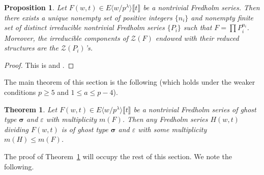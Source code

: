 \documentclass[12pt]{amsart}
\newtheorem{theorem}[subsection]{Theorem}
\newtheorem{proposition}[subsection]{Proposition}
\theoremstyle{definition}
\numberwithin{equation}{subsection}
\def\calZ{\mathcal{Z}}
\newcommand{\bbsigma}{\boldsymbol{\sigma}}
\begin{document}
\begin{proposition}
Let $F(w,t)\in E\langle w/p^\lambda\rangle\llbracket t\rrbracket$ be a nontrivial Fredholm series. Then there exists a unique nonempty set of positive integers $\{n_i\}$ and nonempty  finite set of distinct irreducible nontrivial Fredholm series $\{P_i\}$ such that $F = \prod P_i^{n_i}$. Moreover, the irreducible components of $\calZ(F)$ endowed with their reduced structures are the $\calZ(P_i)$'s.
\end{proposition}
\begin{proof}
This is \cite[Theorem~1.3.7]{coleman-mazur} and \cite[Corollary~4.2.3]{conrad}.
\end{proof}

The main theorem of this section is the following (which holds under the weaker conditions $p \geq 5$ and $1 \leq a\leq p-4$).
\begin{theorem}
\label{T:irreducible factors}
Let $F(w,t) \in E\langle w/p^\lambda\rangle \llbracket t\rrbracket$ be a nontrivial Fredholm series of ghost type $\bbsigma$ and $\varepsilon$ with multiplicity $m(F)$. Then any Fredholm series $H(w,t)$ dividing $F(w,t)$ is of ghost type $\bbsigma$ and $\varepsilon$ with some multiplicity $m(H)\leq m(F)$.
\end{theorem}
The proof of Theorem~\ref{T:irreducible factors} will occupy the rest of this section. We note the following.
\end{document}
